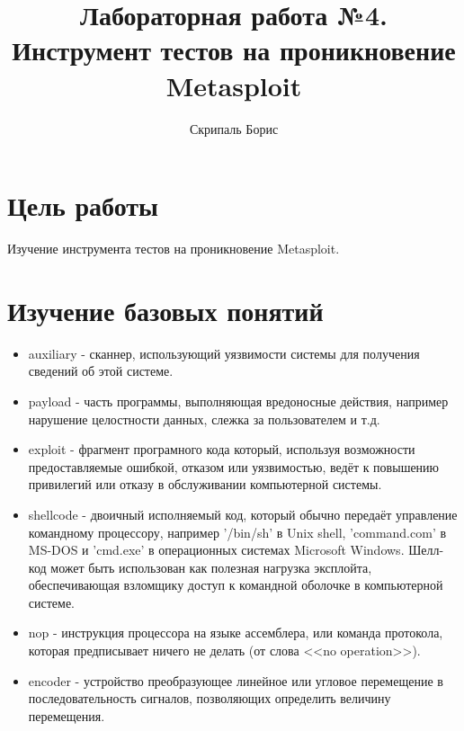 \documentclass[10pt,a4paper]{report}
\author{Скрипаль Борис}
\title{Лабораторная работа №4.\\
	Инструмент тестов на проникновение Metasploit}
\begin{document}
	\maketitle
	\renewcommand{\thesection}{\arabic{section}}
	\tableofcontents
	\pagebreak
	
	\setcounter{totalnumber}{10}
	\setcounter{topnumber}{10}
	\setcounter{bottomnumber}{10}
	\renewcommand{\topfraction}{1}
	\renewcommand{\textfraction}{0}
	
	\section{Цель работы}
		Изучение инструмента тестов на проникновение Metasploit.
	\section{Изучение базовых понятий}
		\begin{itemize}
			\item auxiliary - сканнер, использующий уязвимости системы для получения 
			сведений об этой системе.%
			\item payload - часть программы, выполняющая вредоносные действия, 
			например нарушение целостности данных, слежка за пользователем и т.д.%
			\item exploit - фрагмент програмного кода который, используя
			возможности предоставляемые ошибкой, отказом или уязвимостью, ведёт к
			повышению привилегий или отказу в обслуживании компьютерной системы.
			\item shellcode - двоичный исполняемый код, который обычно передаёт 
			управление командному процессору, например '/bin/sh' в Unix shell, 
			'command.com' в MS-DOS и 'cmd.exe' в операционных системах Microsoft 
			Windows. Шелл-код может быть использован как полезная нагрузка эксплойта, 
			обеспечивающая взломщику доступ к командной оболочке в компьютерной 
			системе.
			\item nop - инструкция процессора на языке ассемблера, или команда 
			протокола, которая предписывает ничего не делать (от слова <<no 
			operation>>).
			\item encoder - устройство преобразующее линейное или угловое перемещение 
			в последовательность сигналов, позволяющих определить величину 
			перемещения. 
		\end{itemize}
		
\end{document}
